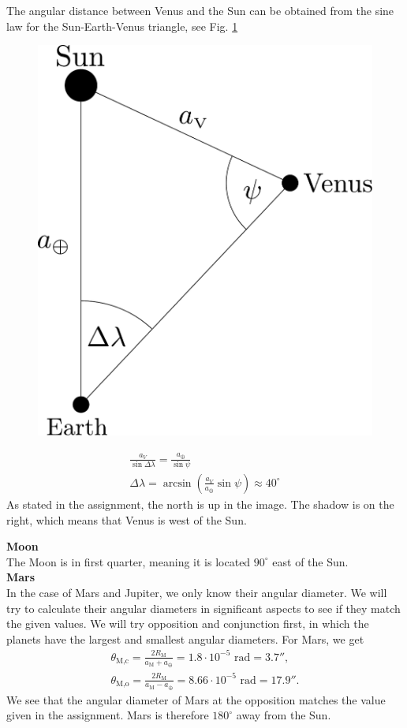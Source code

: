 \documentclass[a4paper,12pt]{extarticle}
\begin{document}
\begin{sol}
\begin{multicols}{2}
The angular distance between Venus and the Sun can be obtained from the sine law for the Sun-Earth-Venus triangle, see Fig. \ref{venus3}

\begin{figure}[H]
	\centering
	\includegraphics[width=0.5\linewidth]{venus_pos2.pdf}
	\caption{}
	\label{venus3}
\end{figure}
\begin{gather*}
	\frac{a_V}{\sin\Delta \lambda}=\frac{a_\oplus}{\sin\psi}\\
	\Delta \lambda =\arcsin\left(\frac{a_V}{a_\oplus}\sin\psi\right) \approx 40^\circ
\end{gather*}
As stated in the assignment, the north is up in the image. The shadow is on the right, which means that Venus is west of the Sun.

\end{multicols}


\textbf{Moon}\\

The Moon is in first quarter, meaning it is located $90^\circ$ east of the Sun.\\

\textbf{Mars}\\

In the case of Mars and Jupiter, we only know their angular diameter. We will try to calculate their angular diameters in significant aspects to see if they match the given values. We will try opposition and conjunction first, in which the planets have the largest and smallest angular diameters. For Mars, we get
\begin{gather*}
	\theta_{\text{M,c}} = \frac{2R_{\text{M}}}{a_{\text{M}} + a_{\oplus}} = 1.8 \cdot 10^{-5} \text{ rad} = 3.7'',\\
	\theta_{\text{M,o}} = \frac{2R_{\text{M}}}{a_{\text{M}} - a_{\oplus}} = 8.66 \cdot 10^{-5} \text{ rad} = 17.9''.
\end{gather*}
We see that the angular diameter of Mars at the opposition matches the value given in the assignment. Mars is therefore $180^\circ$ away from the Sun.\\


\end{sol}
\end{document}
